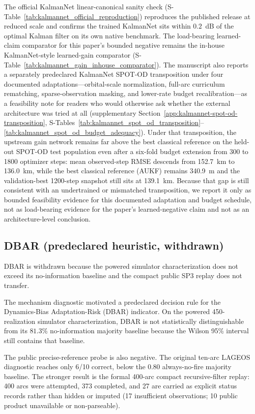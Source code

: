 \documentclass{article}
\begin{document}
The official KalmanNet linear-canonical sanity check (S-Table~\ref{tab:kalmannet_official_reproduction}) reproduces the published release \cite{revach2022kalmannet} at reduced scale and confirms the trained KalmanNet sits within $0.2$~dB of the optimal Kalman filter on its own native benchmark. The load-bearing learned-claim comparator for this paper's bounded negative remains the in-house KalmanNet-style learned-gain comparator (S-Table~\ref{tab:kalmannet_gain_inhouse_comparator}). The manuscript also reports a separately predeclared KalmanNet SPOT-OD transposition under four documented adaptations---orbital-scale normalization, full-arc curriculum rematching, sparse-observation masking, and lower-rate budget recalibration---as a feasibility note for readers who would otherwise ask whether the external architecture was tried at all (supplementary Section~\ref{app:kalmannet-spot-od-transposition}, S-Tables~\ref{tab:kalmannet_spot_od_transposition}--\ref{tab:kalmannet_spot_od_budget_adequacy}). Under that transposition, the upstream gain network remains far above the best classical reference on the held-out SPOT-OD test population even after a six-fold budget extension from 300 to 1800 optimizer steps: mean observed-step RMSE descends from 152.7~km to 136.0~km, while the best classical reference (AUKF) remains 340.9~m and the validation-best 1200-step snapshot still sits at 139.1~km. Because that gap is still consistent with an undertrained or mismatched transposition, we report it only as bounded feasibility evidence for this documented adaptation and budget schedule, not as load-bearing evidence for the paper's learned-negative claim and not as an architecture-level conclusion.\label{sec:kalmannet-spot-od}

\subsection{DBAR (predeclared heuristic, withdrawn)}\label{sec:dbar-withdrawal}
DBAR is withdrawn because the powered simulator characterization does not exceed its no-information baseline and the compact public SP3 replay does not transfer.

The mechanism diagnostic motivated a predeclared decision rule for the Dynamics-Bias Adaptation-Risk (DBAR) indicator. On the powered 450-realization simulator characterization, DBAR is not statistically distinguishable from its $81.3\%$ no-information majority baseline because the Wilson 95\% interval still contains that baseline.

The public precise-reference probe is also negative. The original ten-arc LAGEOS diagnostic reaches only 6/10 correct, below the 0.80 always-no-fire majority baseline. The stronger result is the formal 400-arc compact recursive-filter replay: 400 arcs were attempted, 373 completed, and 27 are carried as explicit status records rather than hidden or imputed (17 insufficient observations; 10 public product unavailable or non-parseable).
\end{document}
